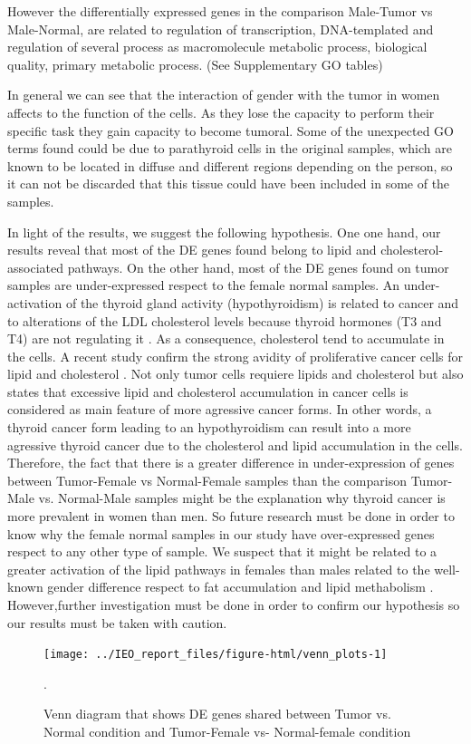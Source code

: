 \documentclass[9pt,twocolumn,twoside]{gsajnl}
\begin{document}
However the differentially expressed genes in the comparison Male-Tumor vs Male-Normal, are related to regulation of transcription, DNA-templated and regulation of several process as macromolecule metabolic process, biological quality, primary metabolic process. (See Supplementary GO tables)

In general we can see that the interaction of gender with the tumor in women affects to the function of the cells. As they lose the capacity to perform their specific task they gain capacity to become tumoral. Some of the unexpected GO terms found could be due to parathyroid cells in the original samples, which are known to be located in diffuse and different regions depending on the person, so it can not be discarded that this tissue could have been included in some of the samples.

In light of the results, we suggest the following hypothesis. One one hand, our results reveal that most of the DE genes found belong to lipid and cholesterol-associated pathways. On the other hand, most of the DE genes found on tumor samples are under-expressed respect to the female normal samples. An under-activation of the thyroid gland activity (hypothyroidism) is related to cancer and to alterations of the LDL cholesterol levels because thyroid hormones (T3 and T4) are not regulating it \citep{tyr}. As a consequence, cholesterol tend to accumulate in the cells. A recent study confirm the strong avidity of proliferative cancer cells for lipid and cholesterol \citep{Beloribi-Djefaflia2016}. Not only tumor cells requiere lipids and cholesterol but also \citet{Beloribi-Djefaflia2016} states that excessive lipid and cholesterol accumulation in cancer cells is considered as main feature of more agressive cancer forms. In other words, a thyroid cancer form leading to an hypothyroidism can result into a more agressive thyroid cancer due to the cholesterol and lipid accumulation in the cells. Therefore, the fact that there is a greater difference in under-expression of genes between Tumor-Female vs Normal-Female samples than the comparison Tumor-Male vs. Normal-Male samples might be the explanation why thyroid cancer is more prevalent in women than men. So future research must be done in order to know why the female normal samples in our study have over-expressed genes respect to any other type of sample. We suspect that it might be related to a greater activation of the lipid pathways in females than males related to the well-known gender difference respect to fat accumulation and lipid methabolism \citep{Blaak2001}. However,further investigation must be done in order to confirm our hypothesis so our results must be taken with caution.
 
\begin{figure}
\centering
\texttt{[image: ../IEO\_report\_files/figure-html/venn\_plots-1]}
\caption{Venn diagram that shows DE genes shared between Tumor vs. Normal condition and Tumor-Female vs- Normal-female condition }.
\label{fig:venn1}
\end{figure}

  

\end{document}
